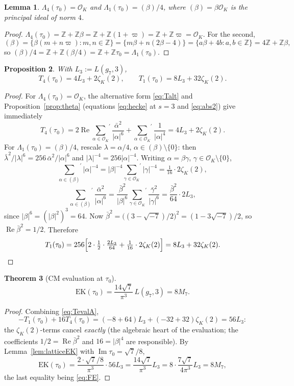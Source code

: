 \documentclass[11pt]{article}
\newtheorem{theorem}{Theorem}[section]
\newtheorem{lemma}[theorem]{Lemma}
\newtheorem{proposition}[theorem]{Proposition}
\theoremstyle{definition}
\theoremstyle{remark}
\newcommand{\Zz}{\mathbb{Z}}
\newcommand{\cL}{\Lambda}
\newcommand{\ImT}{\operatorname{Im}}
\newcommand{\ReT}{\operatorname{Re}}
\newcommand{\OO}{\mathcal{O}}
\begin{document}
\begin{lemma}\label{lem:latticesA}
$\cL_4(\tau_0)=\OO_K$ and $\cL_1(\tau_0)=(\beta)/4$, where
$(\beta)=\beta\OO_K$ is the principal ideal of norm $4$.
\end{lemma}
\begin{proof}
$\cL_4(\tau_0)=\Zz+\Zz\beta=\Zz+\Zz(1+\varpi)=\Zz+\Zz\varpi=\OO_K$.
For the second,
\[
  (\beta)=\{\beta(m+n\varpi):m,n\in\Zz\}
  =\{m\beta+n(2\beta-4)\}=\{a\beta+4b:a,b\in\Zz\}=4\Zz+\Zz\beta,
\]
so $(\beta)/4=\Zz+\Zz(\beta/4)=\Zz+\Zz\tau_0=\cL_1(\tau_0)$.
\end{proof}

\begin{proposition}\label{prop:TevalA}
With $L_3:=L(g_7,3)$,
\begin{equation}\label{eq:TevalA}
  T_4(\tau_0)=4L_3+2\zeta_K(2),\qquad
  T_1(\tau_0)=8L_3+32\zeta_K(2).
\end{equation}
\end{proposition}
\begin{proof}
For $\cL_4(\tau_0)=\OO_K$, the alternative form \eqref{eq:Talt} and
Proposition~\ref{prop:theta} (equations \eqref{eq:hecke} at $s=3$ and
\eqref{eq:abs2}) give immediately
\[
  T_4(\tau_0)
  =2\ReT{\sum_{\alpha\in\OO_K}}^{\!\prime}\frac{\bar\alpha^2}{|\alpha|^6}
   +{\sum_{\alpha\in\OO_K}}^{\!\prime}\frac1{|\alpha|^4}
  =4L_3+2\zeta_K(2).
\]
For $\cL_1(\tau_0)=(\beta)/4$, rescale $\lambda=\alpha/4$,
$\alpha\in(\beta)\setminus\{0\}$: then
$\bar\lambda^2/|\lambda|^6=256\,\bar\alpha^2/|\alpha|^6$ and
$|\lambda|^{-4}=256|\alpha|^{-4}$. Writing $\alpha=\beta\gamma$,
$\gamma\in\OO_K\setminus\{0\}$,
\[
  {\sum_{\alpha\in(\beta)}}^{\!\prime}|\alpha|^{-4}
  =|\beta|^{-4}{\sum_{\gamma\in\OO_K}}^{\!\prime}|\gamma|^{-4}
  =\tfrac1{16}\cdot 2\zeta_K(2),
\]
\[
  {\sum_{\alpha\in(\beta)}}^{\!\prime}\frac{\bar\alpha^2}{|\alpha|^6}
  =\frac{\bar\beta^2}{|\beta|^6}
   {\sum_{\gamma\in\OO_K}}^{\!\prime}\frac{\bar\gamma^2}{|\gamma|^6}
  =\frac{\bar\beta^2}{64}\cdot 2L_3,
\]
since $|\beta|^6=(|\beta|^2)^3=64$. Now
$\bar\beta^2=\bigl((3-\sqrt{-7})/2\bigr)^2=(1-3\sqrt{-7})/2$, so
$\ReT\bar\beta^2=1/2$. Therefore
\[
  T_1(\tau_0)
  =256\Bigl[2\cdot\tfrac12\cdot\tfrac{2L_3}{64}
   +\tfrac1{16}\cdot 2\zeta_K(2)\Bigr]
  =8L_3+32\zeta_K(2). \qedhere
\]
\end{proof}

\begin{theorem}[CM evaluation at $\tau_0$]\label{thm:P1A}
\[
  \mathrm{EK}(\tau_0)=\frac{14\sqrt7}{\pi^3}\,L(g_7,3)=8M_7.
\]
\end{theorem}
\begin{proof}
Combining \eqref{eq:TevalA},
\[
  -T_1(\tau_0)+16T_4(\tau_0)=(-8+64)L_3+(-32+32)\zeta_K(2)=56L_3:
\]
the $\zeta_K(2)$-terms cancel \emph{exactly} (the algebraic heart of the
evaluation; the coefficients $1/2=\ReT\bar\beta^2$ and $16=|\beta|^4$ are
responsible). By Lemma~\ref{lem:latticeEK} with $\ImT\tau_0=\sqrt7/8$,
\[
  \mathrm{EK}(\tau_0)=\frac{2\cdot\sqrt7/8}{\pi^3}\cdot 56L_3
  =\frac{14\sqrt7}{\pi^3}L_3
  =8\cdot\frac{7\sqrt7}{4\pi^3}L_3=8M_7,
\]
the last equality being \eqref{eq:FE}.
\end{proof}
\end{document}
